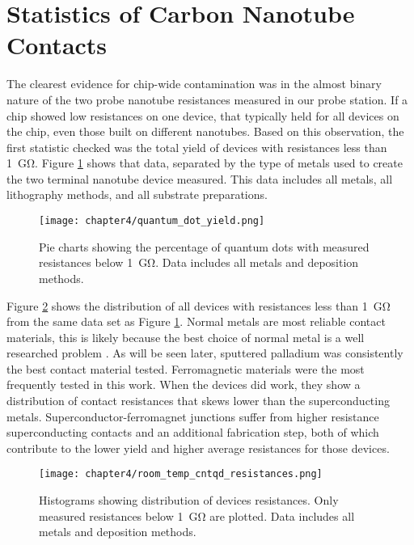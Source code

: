 \section{Statistics of Carbon Nanotube Contacts}

The clearest evidence for chip-wide contamination was in the almost binary nature of the two probe nanotube resistances measured in our probe station. If a chip showed low resistances on one device, that typically held for all devices on the chip, even those built on different nanotubes. Based on this observation, the first statistic checked was the total yield of devices with resistances less than \SI{1}{\giga\ohm}. Figure \ref{fig:quantum_dot_yield} shows that data, separated by the type of metals used to create the two terminal nanotube device measured. This data includes all metals, all lithography methods, and all substrate preparations.

\begin{figure}
    \centering
    \texttt{[image: chapter4/quantum\_dot\_yield.png]}
    \caption{Pie charts showing the percentage of quantum dots with measured resistances below \SI{1}{\giga\ohm}. Data includes all metals and deposition methods.}
    \label{fig:quantum_dot_yield}
\end{figure}

Figure \ref{fig:rt_resistances} shows the distribution of all devices with resistances less than \SI{1}{\giga\ohm} from the same data set as Figure \ref{fig:quantum_dot_yield}. Normal metals are most reliable contact materials, this is likely because the best choice of normal metal is a well researched problem \cite{Javey2003, Song2011, Kane2011}. As will be seen later, sputtered palladium was consistently the best contact material tested. Ferromagnetic materials were the most frequently tested in this work. When the devices did work, they show a distribution of contact resistances that skews lower than the superconducting metals. Superconductor-ferromagnet junctions suffer from higher resistance superconducting contacts and an additional fabrication step, both of which contribute to the lower yield and higher average resistances for those devices.

\begin{figure}
    \centering
    \texttt{[image: chapter4/room\_temp\_cntqd\_resistances.png]}
    \caption{Histograms showing distribution of devices resistances. Only measured resistances below \SI{1}{\giga\ohm} are plotted. Data includes all metals and deposition methods.}
    \label{fig:rt_resistances}
\end{figure}

